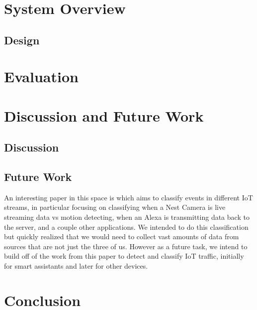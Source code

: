 \documentclass[letterpaper,twocolumn,10pt]{article}
\begin{document}
\section{System Overview}

\subsection{Design}

\section{Evaluation}

\section{Discussion and Future Work}

\subsection{Discussion}

\subsection{Future Work}

An interesting paper in this space is which aims to classify events in different IoT streams, in particular focusing on classifying when a Nest Camera is live streaming data vs motion detecting, when an Alexa is transmitting data back to the server, and a couple other applications. We intended to do this classification but quickly realized that we would need to collect vast amounts of data from sources that are not just the three of us. However as a future task, we intend to build off of the work from this paper to detect and classify IoT traffic, initially for smart assistants and later for other devices. 

\section{Conclusion}


\nocite{*}


\end{document}
